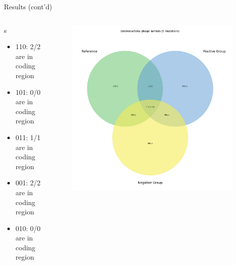 \documentclass{beamer}
\begin{document}
\begin{frame}{Results (cont'd)}
	\begin{columns}
		\footnotesize{
			\begin{column}{.58\textwidth}
				s\textunderscore\@\textunderscore\@Enterobacteria\textunderscore\@phage\textunderscore\@lambda
				\begin{itemize}
					\item 110: 2/2 are in coding region
					\item 101: 0/0 are in coding region
					\item 011: 1/1 are in coding region
					\item 001: 2/2 are in coding region
					\item 010: 0/0 are in coding region
				\end{itemize}
			\end{column}
		}
		\begin{column}{.48\textwidth}
			\begin{figure}[ht]
				\centering
				\includegraphics[width=1\textwidth]{img/Enterobacteria-phage-lambda-venn.png}
				\caption*{\label{fig:Enterobacteria-venn}}
			\end{figure}
		\end{column}
	\end{columns}
\end{frame}
\end{document}
